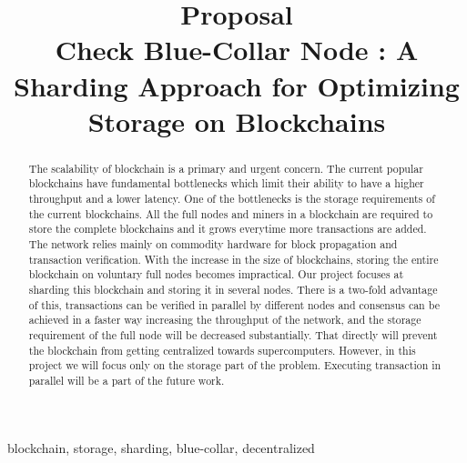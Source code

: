\documentclass[conference]{IEEEtran}
\begin{document}
\title{Proposal\\
Check Blue-Collar Node : A Sharding Approach for Optimizing Storage on Blockchains
}

\author{
\and
{}
}

\maketitle

\begin{abstract}
    The scalability of blockchain is a primary and urgent concern. The current
    popular blockchains have fundamental bottlenecks which limit their ability
    to have a higher throughput and a lower latency. One of the bottlenecks is
    the storage requirements of the current blockchains. All the full nodes and
    miners in a blockchain are required to store the complete blockchains and it
    grows everytime more transactions are added. The network relies mainly on
    commodity hardware for block propagation and transaction verification.
    With the increase in the size of blockchains, storing the entire blockchain
    on voluntary full nodes becomes impractical. Our project focuses at sharding
    this blockchain and storing it in several nodes. There is a two-fold advantage of this,
    transactions can be verified in parallel by different nodes and consensus
    can be achieved in a faster way increasing the throughput of the network,
    and the storage requirement of the full node will be decreased
    substantially. That directly will prevent the blockchain from getting
    centralized towards supercomputers. However, in this project we will focus
    only on the storage part of the problem. Executing transaction in parallel
    will be a part of the future work.
\end{abstract}

\begin{IEEEkeywords}
    blockchain, storage, sharding, blue-collar, decentralized
\end{IEEEkeywords}
\end{document}
